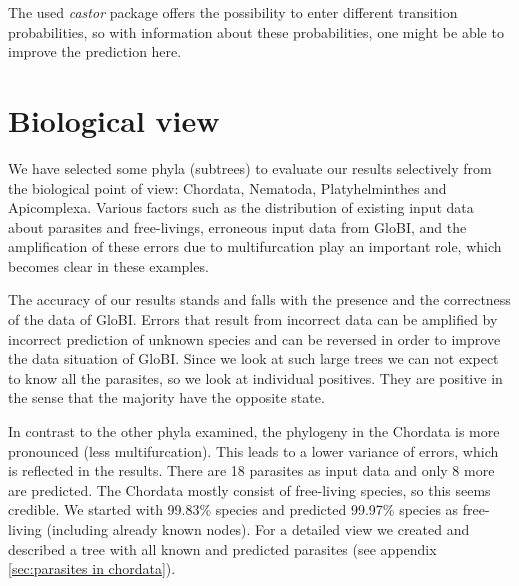 
    The used \textit{castor} package \cite{Louca2017} offers the possibility to enter different 
      transition probabilities, so with information about these probabilities, one might be able to 
      improve the prediction here.

  \section{Biological view}
    We have selected some phyla (subtrees) to evaluate our results selectively 
      from the biological point of view: Chordata, Nematoda, Platyhelminthes and Apicomplexa. Various 
      factors such as the distribution of existing input data about parasites and free-livings, 
      erroneous input data from GloBI, and the amplification of these errors due to multifurcation 
      play an important role, which becomes clear in these examples.

    The accuracy of our results stands and falls with the presence and the correctness of the data of 
      GloBI. Errors that result from incorrect data can be amplified by incorrect prediction of unknown 
      species and can be reversed in order to improve the data situation of GloBI. Since we look at 
      such large trees we can not expect to know all the parasites, so we look at individual positives. 
      They are positive in the sense that the majority have the opposite state.

    In contrast to the other phyla examined, the phylogeny in the Chordata is more pronounced (less 
      multifurcation). This leads to a lower variance of errors, which is reflected in the results. 
      There are 18 parasites as input data and only 8 more are predicted. The Chordata mostly consist 
      of free-living species, so this seems credible. We started with 99.83\%  species and predicted
      99.97\% species as free-living (including already known nodes). For a detailed view we created 
      and described a tree with all known and predicted parasites (see appendix 
      \ref{sec:parasites in chordata}).

